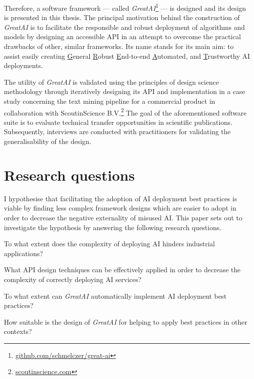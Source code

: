 Therefore, a software framework --- called \textit{GreatAI}\footnote{\href{https://github.com/schmelczer/great-ai}{github.com/schmelczer/great-ai}} --- is designed and its design is presented in this thesis. The principal motivation behind the construction of \textit{GreatAI} is to facilitate the responsible and robust deployment of algorithms and models by designing an accessible API in an attempt to overcome the practical drawbacks of other, similar frameworks. Its name stands for its main aim: to assist easily creating \underline{G}eneral \underline{R}obust \underline{E}nd-to-end \underline{A}utomated, and \underline{T}rustworthy AI deployments.

The utility of \textit{GreatAI} is validated using the principles of design science methodology \cite{wieringa2014design} through iteratively designing its API and implementation in a case study concerning the text mining pipeline for a commercial product in collaboration with ScoutinScience B.V.\footnote{\href{https://scoutinscience.com/}{scoutinscience.com}} The goal of the aforementioned software suite is to evaluate technical transfer opportunities in scientific publications. Subsequently, interviews are conducted with practitioners for validating the generalisability of the design.

\section{Research questions}

I hypothesise that facilitating the adoption of AI deployment best practices is viable by finding less complex framework designs which are easier to adopt in order to decrease the negative externality of misused AI. This paper sets out to investigate the hypothesis by answering the following research questions. 

\begin{rqlist}
  \item To what extent does the complexity of deploying AI hinders industrial applications?
  \item What API design techniques can be effectively applied in order to decrease the complexity of correctly deploying AI services?
  \item To what extent can \textit{GreatAI} automatically implement AI deployment best practices?
  \item How suitable is the design of \textit{GreatAI} for helping to apply best practices in other contexts?
\end{rqlist}

